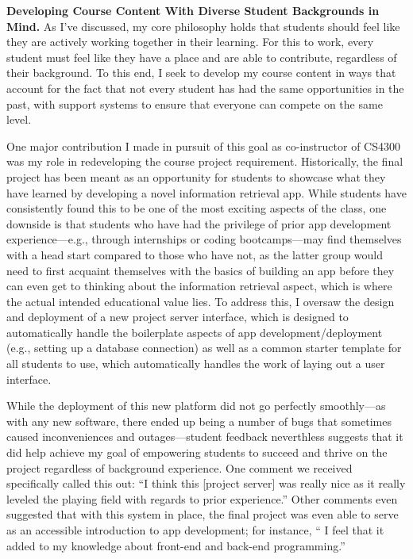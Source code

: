 \documentclass[11pt,letterpaper]{article}
\renewcommand{\section}[1]{\vspace{0.25\baselineskip}\noindent\textbf{#1.}}
\begin{document}
\section{Developing Course Content With Diverse Student Backgrounds in Mind}
As I've discussed, my core philosophy holds that students should feel like they are actively working together in their learning.
For this to work, every student must feel like they have a place and are able to contribute, regardless of their background.
To this end, I seek to develop my course content in ways that account for the fact that not every student has had the same opportunities in the past, with support systems to ensure that everyone can compete on the same level.

One major contribution I made in pursuit of this goal as co-instructor of CS4300 was my role in redeveloping the course project requirement.
Historically, the final project has been meant as an opportunity for students to showcase what they have learned by developing a novel information retrieval app.
While students have consistently found this to be one of the most exciting aspects of the class, one downside is that students who have had the privilege of prior app development experience---e.g., through internships or coding bootcamps---may find themselves with a head start compared to those who have not, as the latter group would need to first acquaint themselves with the basics of building an app before they can even get to thinking about the information retrieval aspect, which is where the actual intended educational value lies.
To address this, I oversaw the design and deployment of a new project server interface, which is designed to automatically handle the boilerplate aspects of app development/deployment (e.g., setting up a database connection) as well as a common starter template for all students to use, which automatically handles the work of laying out a user interface.

While the deployment of this new platform did not go perfectly smoothly---as with any new software, there ended up being a number of bugs that sometimes caused inconveniences and outages---student feedback neverthless suggests that it did help achieve my goal of empowering students to succeed and thrive on the project regardless of background experience.
One comment we received specifically called this out: ``I think this [project server] was really nice as it really leveled the playing field with regards to prior experience.''
Other comments even suggested that with this system in place, the final project was even able to serve as an accessible introduction to app development; for instance, `` I feel that it added to my knowledge about front-end and back-end programming.''
\end{document}
